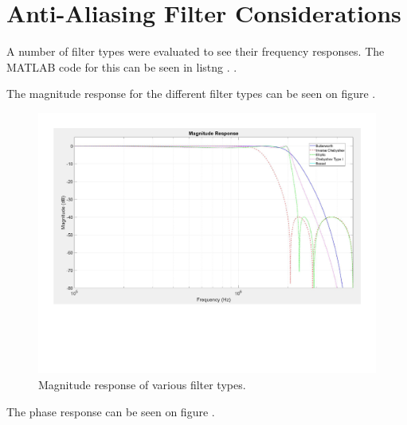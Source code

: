 \chapter{Anti-Aliasing Filter Considerations} \label{App:AntiAliasingFilterConsideration}

A number of filter types were evaluated to see their frequency responses. The MATLAB code for this can be seen in listng .
. 

The magnitude response for the different filter types can be seen on figure .

\begin{figure}[H]
    \centering
    \includegraphics[clip, trim=0 150 0 0, width=1\textwidth]{Appendix/Figures/A_FILT_MAG.pdf}
    \caption{Magnitude response of various filter types.}
    \label{fig:A_FILT_MAG}
\end{figure}

The phase response can be seen on figure .


